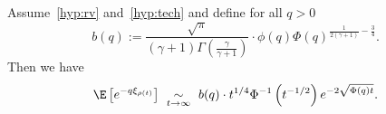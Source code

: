 \begin{theo}\label{thm:asympBehavior}
Assume~\eqref{hyp:rv} and~\eqref{hyp:tech} and define for all $q > 0$
\begin{equation*}\label{eqn:defcq}
b(q) := \frac{\sqrt{\pi}}{(\gamma+1)\Gamma\left(\frac{\gamma}{\gamma + 1}\right)} \cdot \phi(q) \Phi(q)^{\frac{1}{2(\gamma + 1)} - \frac{3}{4}}.
\end{equation*}
Then we have
\[
\E\left[e^{-q \xi_{\rho(t)}}\right]~\underset{t \to \infty} \sim~b(q)\cdot t^{1/4} \Phi^{-1}\left(t^{-1/2}\right) e^{-2 \sqrt{\Phi(q)t}}.
\]
\end{theo}
